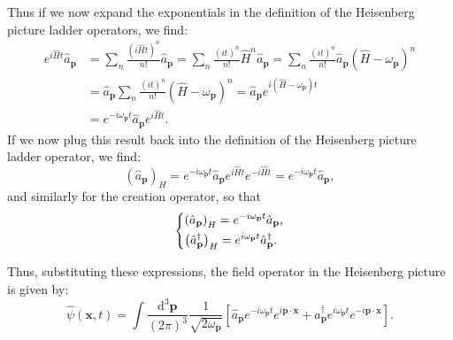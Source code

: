 Thus if we now expand the exponentials in the definition of the Heisenberg picture ladder operators, we find:
\[
    \begin{aligned}
        e^{i \hat{H} t} \hat{a}_{\mathbf{p}} & = \sum_{n} \frac{(i \hat{H} t)^n}{n!} \hat{a}_{\mathbf{p}} = \sum_{n} \frac{(i t)^n}{n!} \hat{H}^n \hat{a}_{\mathbf{p}} = \sum_{n} \frac{(i t)^n}{n!} \hat{a}_{\mathbf{p}} \left(\hat{H} - \omega_{\mathbf{p}}\right)^n \\
                                             & = \hat{a}_{\mathbf{p}} \sum_{n} \frac{(it)^n}{n!}(\hat{H} - \omega_{\mathbf{p}})^n = \hat{a}_{\mathbf{p}} e^{i (\hat{H} - \omega_{\mathbf{p}}) t}                                                                       \\
                                             & = e^{-i \omega_{\mathbf{p}} t} \hat{a}_{\mathbf{p}} e^{i \hat{H} t}.
    \end{aligned}
\]
If we now plug this result back into the definition of the Heisenberg picture ladder operator, we find:
\[
    \left(\hat{a}_{\mathbf{p}}\right)_H = e^{-i \omega_{\mathbf{p}} t} \hat{a}_{\mathbf{p}} e^{i \hat{H} t} e^{-i \hat{H} t} = e^{-i \omega_{\mathbf{p}} t} \hat{a}_{\mathbf{p}},
\]
and similarly for the creation operator, so that
\begin{equation}
    \begin{dcases}
        \left(\hat{a}_{\mathbf{p}}\right)_H = e^{-i \omega_{\mathbf{p}} t} \hat{a}_{\mathbf{p}}, \\
        \left(\hat{a}^{\dagger}_{\mathbf{p}}\right)_H = e^{i \omega_{\mathbf{p}} t} \hat{a}^{\dagger}_{\mathbf{p}}.
    \end{dcases}
    \label{eq:ladder_operators_heisenberg}
\end{equation}

Thus, substituting these expressions, the field operator in the Heisenberg picture is given by:
\[
    \hat{\psi} (\mathbf{x}, t) = \int \frac{\mathrm{d}^3 \mathbf{p}}{(2\pi)^3} \frac{1}{\sqrt{2\omega_{\mathbf{p}}}} \left[ \hat{a}_{\mathbf{p}} e^{-i \omega_{\mathbf{p}} t} e^{i \mathbf{p} \cdot \mathbf{x}} + \hat{a}^{\dagger}_{\mathbf{p}} e^{i \omega_{\mathbf{p}} t} e^{-i \mathbf{p} \cdot \mathbf{x}} \right].
\]

